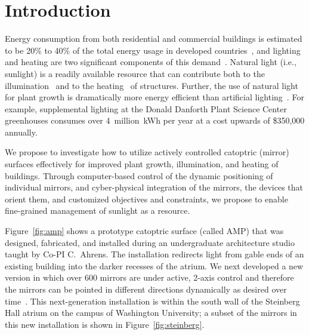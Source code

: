 \section{Introduction}
\label{sec:intro}


Energy consumption from both residential and commercial buildings
is estimated to be 20\% to 40\% of the total energy usage in
developed countries~\cite{pop08}, and
lighting and heating are two significant components of this demand~\cite{keh05}.
Natural light (i.e., sunlight) is a readily available resource that
can contribute both to the illumination~\cite{Leslie03,ll01,Libby03}
and to the heating~\cite{kbd76,Lunde80,wo06} of structures.
Further, the use of natural light for plant growth is dramatically more
energy efficient than artificial lighting~\cite{Bugbee16,economist}.
For example, supplemental lighting at the Donald Danforth Plant Science Center
greenhouses consumes over 4~million~kWh per year at a cost upwards of
\$350,000 annually.

We propose to investigate how to utilize actively
controlled catoptric (mirror) surfaces effectively for improved
plant growth, illumination, and heating of buildings.  Through computer-based control of
the dynamic positioning of
individual mirrors, and cyber-physical integration of the mirrors,
the devices
that orient them, and customized objectives and
constraints,
we propose to enable fine-grained management of sunlight as a resource.

Figure~\ref{fig:amp} shows a prototype catoptric surface (called AMP) that was 
designed, fabricated, and installed during an undergraduate architecture studio 
taught by Co-PI C.~Ahrens. The installation redirects light from gable ends of an 
existing building into the darker recesses of the atrium.
We next developed a
new version in which over 600 mirrors are under 
active, 2-axis control and therefore the mirrors
can be pointed in different directions dynamically as desired over
time~\cite{acmbg19,acmb18,cagm18}. 
This next-generation installation is within 
the south wall of the Steinberg Hall atrium on the campus of 
Washington University; a subset of the mirrors in this new
installation is shown in Figure~\ref{fig:steinberg}.

